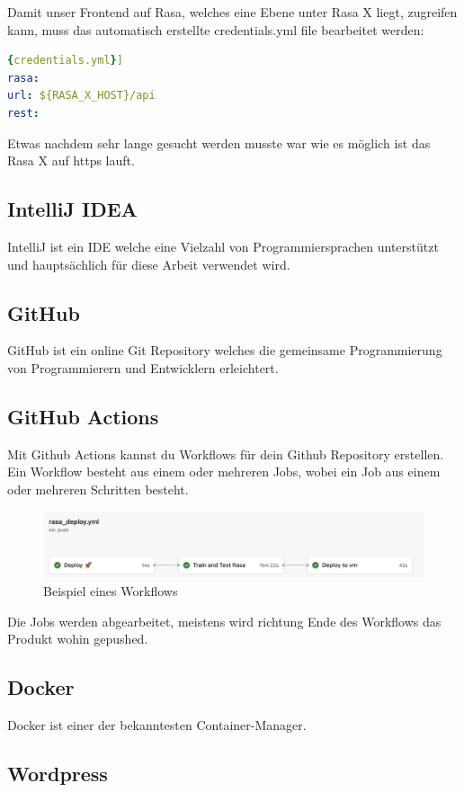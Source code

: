 Damit unser Frontend auf Rasa, welches eine Ebene unter Rasa X liegt, zugreifen kann, muss das automatisch erstellte credentials.yml file bearbeitet werden:

\begin{lstlisting}[language=yaml,label={lst:rasaXCred},caption={credentials.yml}]{credentials.yml}]
rasa:
url: ${RASA_X_HOST}/api
rest:
\end{lstlisting}

Etwas nachdem sehr lange gesucht werden musste war wie es möglich ist das Rasa X auf https lauft.



\subsection{IntelliJ IDEA}
IntelliJ ist ein IDE welche eine Vielzahl von Programmiersprachen unterstützt und hauptsächlich für diese Arbeit verwendet wird.

\subsection{GitHub}
GitHub ist ein online Git Repository welches die gemeinsame Programmierung von Programmierern und Entwicklern erleichtert.

\subsection{GitHub Actions}\label{subsec:github-actions}
Mit Github Actions kannst du Workflows für dein Github Repository erstellen.
Ein Workflow besteht aus einem oder mehreren Jobs, wobei ein Job aus einem oder mehreren Schritten besteht.

\begin{figure}[hbt!]
    \centering
    \includegraphics[scale=0.5]{pics/ghActions}
    \caption{Beispiel eines Workflows}
    \label{fig:impl:ghActions}
\end{figure}

Die Jobs werden abgearbeitet, meistens wird richtung Ende des Workflows das Produkt wohin gepushed.
\subsection{Docker}
Docker ist einer der bekanntesten Container-Manager.

\subsection{Wordpress}
